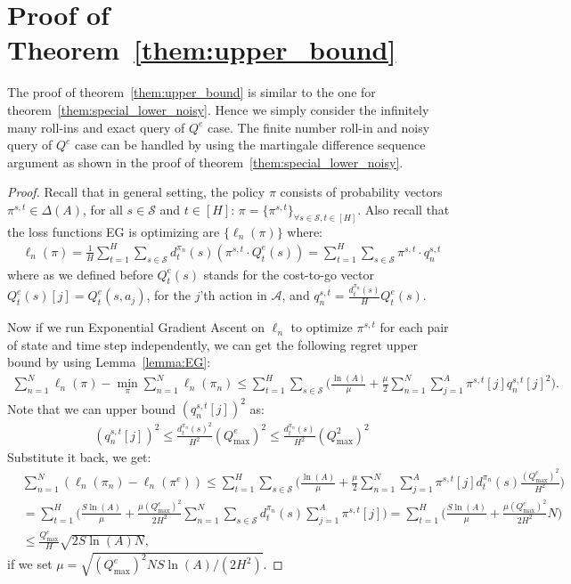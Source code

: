 \documentclass{article}
\begin{document}
\section{Proof of Theorem~\ref{them:upper_bound}}
\label{sec:proof_upper_bound}
The proof of theorem~\ref{them:upper_bound} is similar to the one for theorem~\ref{them:special_lower_noisy}. Hence we simply consider the infinitely many roll-ins and exact query of $Q^e$ case. The finite number roll-in and noisy query of $Q^e$ case can be handled by using the martingale difference sequence argument as shown in the proof of theorem~\ref{them:special_lower_noisy}.

\begin{proof}
Recall that in general setting, the policy $\pi$ consists of probability vectors $\pi^{s,t}\in\Delta(A)$, for all $s\in\mathcal{S}$ and $t\in[H]$: $\pi = \{\pi^{s,t}\}_{\forall s\in \mathcal{S},t\in[H]}$. Also recall that the loss functions EG is optimizing are $\{\ell_n(\pi)\}$ where:
\begin{align}
\ell_n(\pi) = \frac{1}{H}\sum_{t=1}^H\sum_{s\in\mathcal{S}} d_t^{\pi_n}(s) (\pi^{s,t}\cdot Q_t^e(s)) = \sum_{t=1}^H\sum_{s\in\mathcal{S}}\pi^{s,t}\cdot q_n^{s,t}
\end{align} where as we defined before $Q_t^e(s)$ stands for the cost-to-go vector $Q_t^e(s)[j] = Q_t^e(s,a_j)$, for the $j$'th action in $\mathcal{A}$, and $q_n^{s,t} = \frac{d_t^{\pi_n}(s)}{H}Q_t^e(s)$.  


Now if we run Exponential Gradient Ascent on $\ell_n$ to optimize $\pi^{s,t}$ for each pair of state and time step independently, we can get the following regret upper bound by using Lemma~\ref{lemma:EG}:
\begin{align}
\sum_{n=1}^N \ell_n(\pi) - \min_{\pi}\sum_{n=1}^N\ell_n(\pi_n) \leq \sum_{t=1}^H\sum_{s\in\mathcal{S}}\big( \frac{\ln(A)}{\mu} + \frac{\mu}{2}\sum_{n=1}^N\sum_{j=1}^A \pi^{s,t}[j] q_n^{s,t}[j]^2\big).
\end{align} Note that we can upper bound $(q_n^{s,t}[j])^2$ as:
\begin{align}
(q_n^{s,t}[j])^2 \leq \frac{d_t^{\pi_n}(s)^2}{H^2}(Q^e_{\max})^2 \leq \frac{d_t^{\pi_n}(s)}{H^2} (Q^2_{\max})^2 
\end{align}
Substitute it back, we get:
\begin{align}
&\sum_{n=1}^N (\ell_n(\pi_n) - \ell_n(\pi^e)) \leq \sum_{t=1}^H\sum_{s\in\mathcal{S}} \big(\frac{\ln(A)}{\mu} + \frac{\mu}{2}\sum_{n=1}^N\sum_{j=1}^A \pi^{s,t}[j] d_t^{\pi_n}(s)\frac{(Q^e_{\max})^2}{H^2} \big) \nonumber\\
& = \sum_{t=1}^H \big(\frac{S\ln(A)}{\mu} + \frac{\mu(Q^e_{\max})^2}{2H^2}\sum_{n=1}^N\sum_{s\in\mathcal{S}}d_t^{\pi_n}(s)\sum_{j=1}^A\pi^{s,t}[j]\big) = \sum_{t=1}^H \big( \frac{S\ln(A)}{\mu} + \frac{\mu(Q^e_{\max})^2}{2H^2}N\big) \nonumber\\
& \leq \frac{Q^e_{\max}}{H}\sqrt{2S\ln(A)N},
\end{align} if we set $\mu = \sqrt{(Q^e_{\max})^2NS\ln(A)/(2H^2)}$.


\end{proof}
\end{document}
